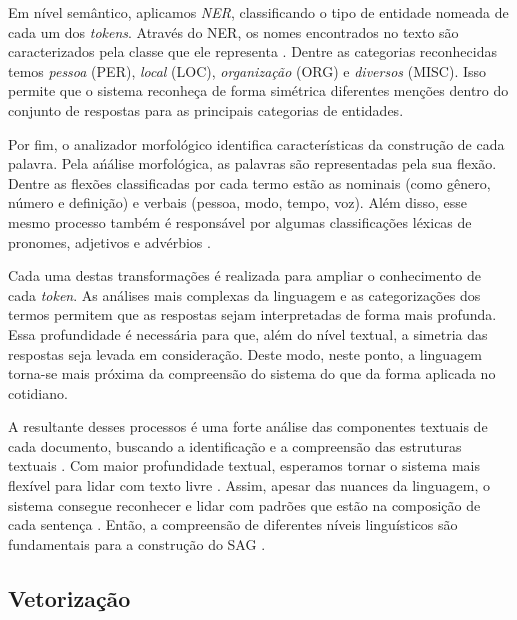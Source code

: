 Em nível semântico, aplicamos \textit{NER}, classificando o tipo de entidade nomeada de cada um dos \textit{tokens}. Através do NER, os nomes encontrados no texto são caracterizados pela classe que ele representa \cite{pirovani2019}. Dentre as categorias reconhecidas temos \textit{pessoa} (PER), \textit{local} (LOC), \textit{organização} (ORG) e \textit{diversos} (MISC). Isso permite que o sistema reconheça de forma simétrica diferentes menções dentro do conjunto de respostas para as principais categorias de entidades.

Por fim, o analizador morfológico identifica características da construção de cada palavra. Pela ańálise morfológica, as palavras são representadas pela sua flexão. Dentre as flexões classificadas por cada termo estão as nominais (como gênero, número e definição) e verbais (pessoa, modo, tempo, voz). Além disso, esse mesmo processo também é responsável por algumas classificações léxicas de pronomes, adjetivos e advérbios \cite{marneffe2021}.

Cada uma destas transformações é realizada para ampliar o conhecimento de cada \textit{token}. As análises mais complexas da linguagem e as categorizações dos termos permitem que as respostas sejam interpretadas de forma mais profunda. Essa profundidade é necessária para que, além do nível textual, a simetria das respostas seja levada em consideração. Deste modo, neste ponto, a linguagem torna-se mais próxima da compreensão do sistema do que da forma aplicada no cotidiano.

A resultante desses processos é uma forte análise das componentes textuais de cada documento, buscando a identificação e a compreensão das estruturas textuais \cite{spalenza2020}. Com maior profundidade textual, esperamos tornar o sistema mais flexível para lidar com texto livre \cite{ding2020}. Assim, apesar das nuances da linguagem, o sistema consegue reconhecer e lidar com padrões que estão na composição de cada sentença \cite{filighera2020}. Então, a compreensão de diferentes níveis linguísticos são fundamentais para a construção do SAG \cite{sahu2020}.


\subsection{Vetorização}
\label{subsec-vetorizacao}

